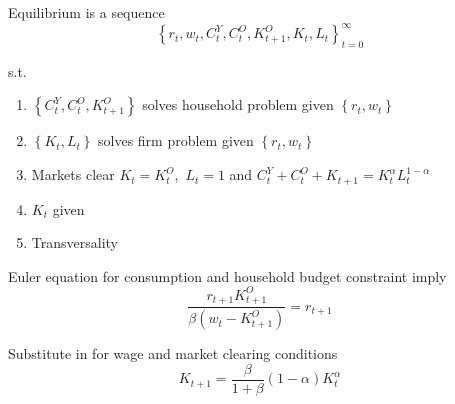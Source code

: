 \documentclass[notes=show]{beamer}
\begin{document}
\begin{frame}%


Equilibrium is a sequence 
\begin{equation*}
\left\{ r_{t},w_{t},C_{t}^{Y},C_{t}^{O},K_{t+1}^{O},K_{t},L_{t}\right\}
_{t=0}^{\infty }
\end{equation*}

s.t.

\begin{enumerate}
\item $\left\{ C_{t}^{Y},C_{t}^{O},K_{t+1}^{O}\right\} $ solves household
problem given $\left\{ r_{t},w_{t}\right\} $

\item $\left\{ K_{t},L_{t}\right\} $ solves firm problem given $\left\{
r_{t},w_{t}\right\} $

\item Markets clear $K_{t}=K_{t}^{O}$,~$L_{t}=1$ and $%
C_{t}^{Y}+C_{t}^{O}+K_{t+1}=K_{t}^{\alpha }L_{t}^{1-\alpha }$

\item $K_{t}$ given

\item Transversality
\end{enumerate}

\transboxout%
\end{frame}%

\begin{frame}%


Euler equation for consumption and household budget constraint imply%
\begin{equation*}
\frac{r_{t+1}K_{t+1}^{O}}{\beta \left( w_{t}-K_{t+1}^{O}\right) }=r_{t+1}
\end{equation*}

Substitute in for wage and market clearing conditions%
\begin{equation*}
K_{t+1}=\frac{\beta }{1+\beta }\left( 1-\alpha \right) K_{t}^{\alpha }
\end{equation*}

\transboxout%
\end{frame}%
\end{document}
